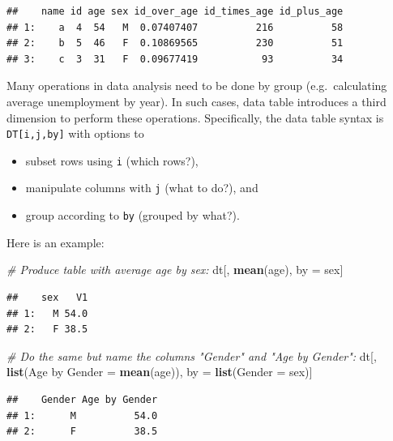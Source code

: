 \documentclass[
]{book}
\newenvironment{Shaded}{\begin{snugshade}}{\end{snugshade}}
\newcommand{\AttributeTok}[1]{\textcolor[rgb]{0.13,0.29,0.53}{#1}}
\newcommand{\CommentTok}[1]{\textcolor[rgb]{0.56,0.35,0.01}{\textit{#1}}}
\newcommand{\FunctionTok}[1]{\textcolor[rgb]{0.13,0.29,0.53}{\textbf{#1}}}
\newcommand{\NormalTok}[1]{#1}
\newcommand{\OtherTok}[1]{\textcolor[rgb]{0.56,0.35,0.01}{#1}}
\newcommand{\StringTok}[1]{\textcolor[rgb]{0.31,0.60,0.02}{#1}}
\providecommand{\tightlist}{%
  \setlength{\itemsep}{0pt}\setlength{\parskip}{0pt}}
\begin{document}
\begin{verbatim}
##    name id age sex id_over_age id_times_age id_plus_age
## 1:    a  4  54   M  0.07407407          216          58
## 2:    b  5  46   F  0.10869565          230          51
## 3:    c  3  31   F  0.09677419           93          34
\end{verbatim}

Many operations in data analysis need to be done by group (e.g.~calculating average unemployment by year). In such cases, data table introduces a third dimension to perform these operations. Specifically, the data table syntax is \texttt{DT{[}i,j,by{]}} with options to

\begin{itemize}
\tightlist
\item
  subset rows using \texttt{i} (which rows?),
\item
  manipulate columns with \texttt{j} (what to do?), and
\item
  group according to \texttt{by} (grouped by what?).
\end{itemize}

Here is an example:

\begin{Shaded}
\begin{Highlighting}[]
\CommentTok{\# Produce table with average age by sex:}
\NormalTok{dt[, }\FunctionTok{mean}\NormalTok{(age), by }\OtherTok{=}\NormalTok{ sex]}
\end{Highlighting}
\end{Shaded}

\begin{verbatim}
##    sex   V1
## 1:   M 54.0
## 2:   F 38.5
\end{verbatim}

\begin{Shaded}
\begin{Highlighting}[]
\CommentTok{\# Do the same but name the columns "Gender" and "Age by Gender":}
\NormalTok{dt[, }\FunctionTok{list}\NormalTok{(}\StringTok{\textasciigrave{}}\AttributeTok{Age by Gender}\StringTok{\textasciigrave{}} \OtherTok{=} \FunctionTok{mean}\NormalTok{(age)), by }\OtherTok{=} \FunctionTok{list}\NormalTok{(}\AttributeTok{Gender =}\NormalTok{ sex)]}
\end{Highlighting}
\end{Shaded}

\begin{verbatim}
##    Gender Age by Gender
## 1:      M          54.0
## 2:      F          38.5
\end{verbatim}
\end{document}
